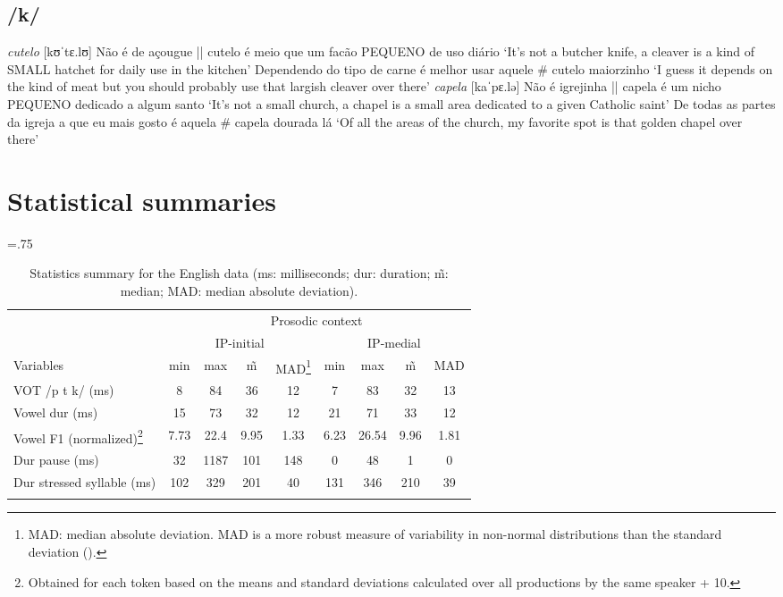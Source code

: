 \documentclass[output=paper]{langscibook}
\begin{document}
\begin{paperappendix}
\subsection{/k/}
\ea \textit{cutelo} [kʊˈtɛ.lʊ] 
\ea Não é de açougue || cutelo é meio que um facão PEQUENO de uso diário
\glt`It's not a butcher knife, a cleaver is a kind of SMALL hatchet for daily use in the kitchen'
\ex Dependendo do tipo de carne é melhor usar aquele \# cutelo maiorzinho
\glt`I guess it depends on the kind of meat but you should probably use that largish cleaver over there'
\z
\ex \textit{capela} [kaˈpɛ.lə]
\ea Não é igrejinha || capela é um nicho PEQUENO dedicado a algum santo
\glt`It’s not a small church, a chapel is a small area dedicated to a given Catholic saint'
\ex De todas as partes da igreja a que eu mais gosto é aquela \# capela dourada lá
\glt`Of all the areas of the church, my favorite spot is that golden chapel over there'
\z
\z

\section{Statistical summaries}\label{D}

\begin{table}[H]
\small\tabcolsep=.75\tabcolsep
\caption{Statistics summary for the English data (ms: milliseconds; dur: duration; \~m: median; MAD: median absolute deviation).\label{tab:table:D1}}
 \begin{tabular}{lcccccccc}
  \lsptoprule
            & \multicolumn{8}{c}{Prosodic context}\\\cmidrule(lr){2-9}
            & \multicolumn{4}{c}{IP-initial} & \multicolumn{4}{c}{IP-medial}\\\cmidrule(lr){2-5}\cmidrule(lr){6-9}
Variables & min & max & \~m & MAD\footnote{MAD: median absolute deviation. MAD is a more robust measure of variability in non-normal distributions than the standard deviation (\cite{l15}).} & min & max & \~m & MAD\\\midrule
VOT /p t k/ (ms)	& 8 &	84 &	36 & 12  &	7 &	83 &	32 & 13 \\
Vowel dur (ms)	& 15 &	73	 & 32 & 12 	& 21	 &71 &	33 & 12 \\
Vowel F1 (normalized)\footnote{Obtained for each token based on the means and standard deviations calculated over all productions by the same speaker + 10.}	& 7.73 &	22.4 &	9.95 & 1.33  &	6.23 &	26.54 & 	9.96 & 1.81 \\
Dur pause (ms)	& 32	 & 1187 &	101  & 148  &	0	 & 48 &	1 & 0 \\
Dur stressed syllable (ms)	& 102	& 329 &	201 & 40  &	131 &	346	 & 210 & 39 \\
  \lspbottomrule
 \end{tabular}
\end{table}



\end{paperappendix}
\end{document}
